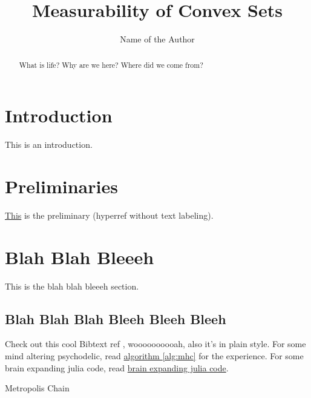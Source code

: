 \documentclass[]{article}
\title{Measurability of Convex Sets}
\author{Name of the Author}
\theoremstyle{definition}
\numberwithin{equation}{subsection}
\begin{document}
\maketitle

\begin{abstract}
    What is life? Why are we here? Where did we come from?
\end{abstract}


\section{Introduction}
    This is an introduction. 

\section{Preliminaries}\label{sec:preliminaries}
    \hyperref[sec:preliminaries]{This} is the preliminary (hyperref without text labeling). 
    
\section{Blah Blah Bleeeh}
    This is the blah blah bleeeh section. 
    \subsection{Blah Blah Blah Bleeh Bleeh Bleeh}
    Check out this cool Bibtext ref \cite[this]{texbook}, woooooooooah, also it's in plain style. For some mind altering psychodelic, read \hyperref[alg:mhc]{algorithm \ref*{alg:mhc}} for the experience. For some brain expanding julia code, read \hyperref[code:brain_expand]{brain expanding julia code}. 
    \begin{algorithm}
        \begin{algorithmic}[t]
        \end{algorithmic}
        \caption{Metropolis Chain}
        \label{alg:mhc}
    \end{algorithm}
    \label{code:brain_expand}
    
    
\end{document}
